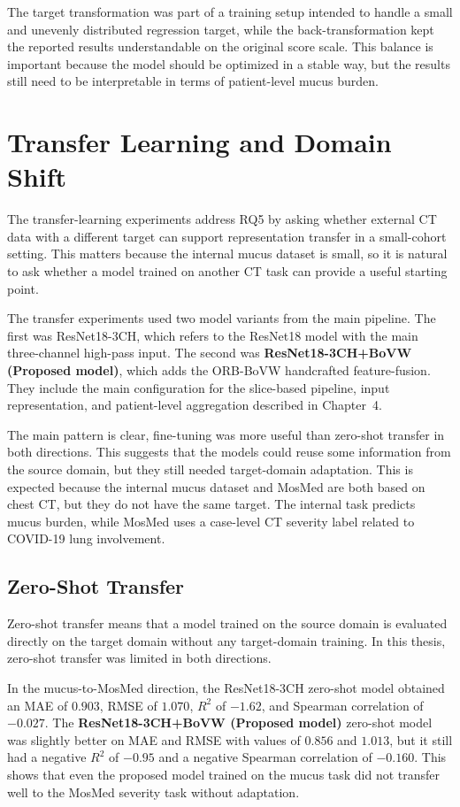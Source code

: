 The target transformation was part of a training setup intended to handle a small and unevenly distributed regression target, while the back-transformation kept the reported results understandable on the original score scale. This balance is important because the model should be optimized in a stable way, but the results still need to be interpretable in terms of patient-level mucus burden.


\section{Transfer Learning and Domain Shift}
The transfer-learning experiments address RQ5 by asking whether external CT data with a different target can support representation transfer in a small-cohort setting. This matters because the internal mucus dataset is small, so it is natural to ask whether a model trained on another CT task can provide a useful starting point.

The transfer experiments used two model variants from the main pipeline. The first was ResNet18-3CH, which refers to the ResNet18 model with the main three-channel high-pass input. The second was \textbf{ResNet18-3CH+BoVW (Proposed model)}, which adds the ORB-BoVW handcrafted feature-fusion. They include the main configuration for the slice-based pipeline, input representation, and patient-level aggregation described in Chapter~4.

The main pattern is clear, fine-tuning was more useful than zero-shot transfer in both directions. This suggests that the models could reuse some information from the source domain, but they still needed target-domain adaptation. This is expected because the internal mucus dataset and MosMed are both based on chest CT, but they do not have the same target. The internal task predicts mucus burden, while MosMed uses a case-level CT severity label related to COVID-19 lung involvement.


\subsection{Zero-Shot Transfer}
Zero-shot transfer means that a model trained on the source domain is evaluated directly on the target domain without any target-domain training. In this thesis, zero-shot transfer was limited in both directions.

In the mucus-to-MosMed direction, the ResNet18-3CH zero-shot model obtained an MAE of \(0.903\), RMSE of \(1.070\), \(R^2\) of \(-1.62\), and Spearman correlation of \(-0.027\). The \textbf{ResNet18-3CH+BoVW (Proposed model)} zero-shot model was slightly better on MAE and RMSE with values of \(\mathbf{0.856}\) and \(\mathbf{1.013}\), but it still had a negative \(R^2\) of \(\mathbf{-0.95}\) and a negative Spearman correlation of \(\mathbf{-0.160}\). This shows that even the proposed model trained on the mucus task did not transfer well to the MosMed severity task without adaptation.


